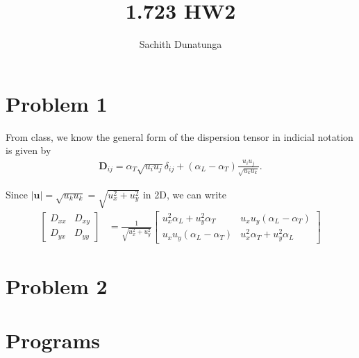 \documentclass{article}
\title{1.723 HW2}
\author{Sachith  Dunatunga}
\begin{document}
\maketitle

%
%
%
\section{Problem 1}
From class, we know the general form of the dispersion tensor in indicial notation is given by
\begin{align}
    \mathbf{D}_{ij} = \alpha_T \sqrt{u_i u_j} \delta_{ij} + (\alpha_L - \alpha_T) \frac{u_i u_j}{\sqrt{u_k u_k}}.
\end{align}

Since $|\mathbf{u}| = \sqrt{u_k u_k} = \sqrt{u_x^2 + u_y^2}$ in 2D, we can write
\begin{align}
    \begin{bmatrix}
        D_{xx} & D_{xy} \\
        D_{yx} & D_{yy}
    \end{bmatrix} &= \frac{1}{\sqrt{u_x^2 + u_y^2}}
    \begin{bmatrix}
        u_x^2 \alpha_L  + u_y^2 \alpha_T & u_x u_y (\alpha_L - \alpha_T) \\
        u_x u_y (\alpha_L - \alpha_T) & u_x^2 \alpha_T + u_y^2 \alpha_L
    \end{bmatrix}
\end{align}
\section{Problem 2}


\appendix
\section{Programs}
% 
\end{document}
